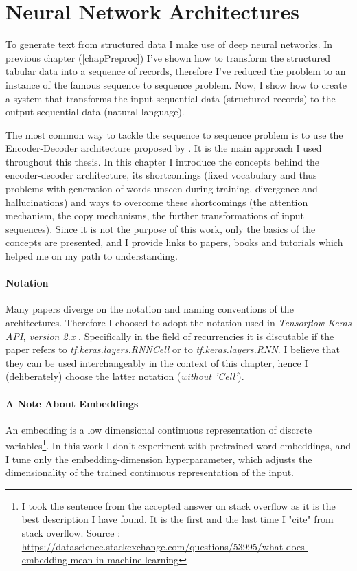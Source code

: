 \chapter{Neural Network Architectures} \label{neural_nets_chapter}
To generate text from structured data I make use of deep neural networks. In previous chapter (\ref{chapPreproc}) I've shown how to transform the structured tabular data into a sequence of records, therefore I've reduced the problem to an instance of the famous sequence to sequence problem. Now, I show how to create a system that transforms the input sequential data (structured records) to the output sequential data (natural language).

The most common way to tackle the sequence to sequence problem is to use the Encoder-Decoder architecture proposed by \citep{sutskever2014sequence}. It is the main approach I used throughout this thesis. In this chapter I introduce the concepts behind the encoder-decoder architecture, its shortcomings (fixed vocabulary and thus problems with generation of words unseen during training, divergence and hallucinations) and ways to overcome these shortcomings (the attention mechanism, the copy mechanisms, the further transformations of input sequences). Since it is not the purpose of this work, only the basics of the concepts are presented, and I provide links to papers, books and tutorials which helped me on my path to understanding.

\subsubsection{Notation}
Many papers diverge on the notation and naming conventions of the architectures. Therefore I choosed to adopt the notation used in \emph{Tensorflow Keras API, version 2.x} \citep{tensorflow2015-whitepaper}. Specifically in the field of recurrencies it is discutable if the paper refers to \emph{tf.keras.layers.RNNCell} or to \emph{tf.keras.layers.RNN}. I believe that they can be used interchangeably in the context of this chapter, hence I (deliberately) choose the latter notation (\emph{without 'Cell'}).

\subsubsection{A Note About Embeddings} \label{subsection:embeddings}

An embedding is a low dimensional continuous representation of discrete variables\footnote{I took the sentence from the accepted answer on stack overflow as it is the best description I have found. It is the first and the last time I "cite" from stack overflow. Source : \url{https://datascience.stackexchange.com/questions/53995/what-does-embedding-mean-in-machine-learning}}. In this work I don't experiment with pretrained word embeddings, and I tune only the embedding-dimension hyperparameter, which adjusts the dimensionality of the trained continuous representation of the input.

